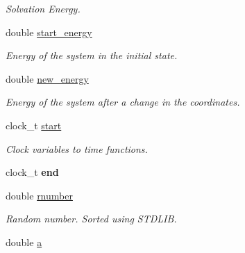 \begin{DoxyCompactItemize}
\begin{DoxyCompactList}\small\item\em Solvation Energy. \item\end{DoxyCompactList}\item 
\hypertarget{classTEMP__SCHEME_ae43c44e0b809c88b8dacb74e6dee5d41}{
double \hyperlink{classTEMP__SCHEME_ae43c44e0b809c88b8dacb74e6dee5d41}{start\_\-energy}}
\label{classTEMP__SCHEME_ae43c44e0b809c88b8dacb74e6dee5d41}

\begin{DoxyCompactList}\small\item\em Energy of the system in the initial state. \item\end{DoxyCompactList}\item 
\hypertarget{classTEMP__SCHEME_a5a22cdf222018fc38dd376b9046cb9b7}{
double \hyperlink{classTEMP__SCHEME_a5a22cdf222018fc38dd376b9046cb9b7}{new\_\-energy}}
\label{classTEMP__SCHEME_a5a22cdf222018fc38dd376b9046cb9b7}

\begin{DoxyCompactList}\small\item\em Energy of the system after a change in the coordinates. \item\end{DoxyCompactList}\item 
\hypertarget{classTEMP__SCHEME_a13323b1a4cadfa4bf6d0a5bfd9159ec6}{
clock\_\-t \hyperlink{classTEMP__SCHEME_a13323b1a4cadfa4bf6d0a5bfd9159ec6}{start}}
\label{classTEMP__SCHEME_a13323b1a4cadfa4bf6d0a5bfd9159ec6}

\begin{DoxyCompactList}\small\item\em Clock variables to time functions. \item\end{DoxyCompactList}\item 
\hypertarget{classTEMP__SCHEME_a2d22028f65f9411944e7675116cf10ec}{
clock\_\-t {\bfseries end}}
\label{classTEMP__SCHEME_a2d22028f65f9411944e7675116cf10ec}

\item 
\hypertarget{classTEMP__SCHEME_a54131d8db672d173825ebc06b6b67e80}{
double \hyperlink{classTEMP__SCHEME_a54131d8db672d173825ebc06b6b67e80}{rnumber}}
\label{classTEMP__SCHEME_a54131d8db672d173825ebc06b6b67e80}

\begin{DoxyCompactList}\small\item\em Random number. Sorted using STDLIB. \item\end{DoxyCompactList}\item 
\hypertarget{classTEMP__SCHEME_ac1239edb777a1d8c1fe84b2abf36d05c}{
double \hyperlink{classTEMP__SCHEME_ac1239edb777a1d8c1fe84b2abf36d05c}{a}}
\label{classTEMP__SCHEME_ac1239edb777a1d8c1fe84b2abf36d05c}


\end{DoxyCompactItemize}
